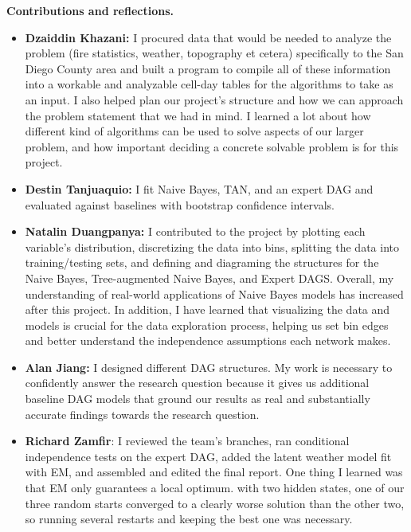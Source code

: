 \documentclass[11pt]{article}
\begin{document}
\textbf{Contributions and reflections.}
\begin{itemize}\setlength{\itemsep}{1pt}\setlength{\parskip}{0pt}
  \item \textbf{Dzaiddin Khazani:} I procured data that would be needed to analyze the problem (fire statistics, weather, topography et cetera) specifically to the San Diego County area and built a program to compile all of these information into a workable and analyzable cell-day tables for the algorithms to take as an input. I also helped plan our project's structure and how we can approach the problem statement that we had in mind. I learned a lot about how different kind of algorithms can be used to solve aspects of our larger problem, and how important deciding a concrete solvable problem is for this project.
  \item \textbf{Destin Tanjuaquio:} I fit Naive Bayes, TAN, and an expert DAG and evaluated against baselines with bootstrap confidence intervals.
  \item \textbf{Natalin Duangpanya:} I contributed to the project by plotting each variable's distribution, discretizing the data into bins, splitting the data into training/testing sets, and defining and diagraming the structures for the Naive Bayes, Tree-augmented Naive Bayes, and Expert DAGS. Overall, my understanding of real-world applications of Naive Bayes models has increased after this project. In addition, I have learned that visualizing the data and models is crucial for the data exploration process, helping us set bin edges and better understand the independence assumptions each network makes.
  \item \textbf{Alan Jiang:} I designed different DAG structures. My work is necessary to confidently answer the research question because it gives us additional baseline DAG models that ground our results as real and substantially accurate findings towards the research question.
  \item \textbf{Richard Zamfir}: I reviewed the team's branches, ran conditional independence  tests on the expert DAG, added the latent weather model fit with EM, and assembled and edited the final report. One thing I learned was that EM only guarantees a local optimum. with two hidden states, one of our three random starts converged to a clearly worse solution than the other two, so running several restarts and keeping the best one was necessary.
 \end{itemize}
\end{document}
